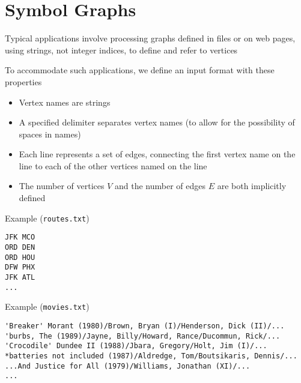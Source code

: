 \documentclass[8pt,a4paper,compress]{beamer}
\begin{document}
\section{Symbol Graphs}
\begin{frame}[fragile]
\pause

Typical applications involve processing graphs defined in files or
on web pages, using strings, not integer indices, to define and refer to vertices

\pause
\bigskip

To accommodate such applications, we define an input format with these properties
\begin{itemize}
\item Vertex names are strings
\item A specified delimiter separates vertex names (to allow for the possibility of spaces in names)
\item Each line represents a set of edges, connecting the first vertex name on the line to each of the other vertices named on the line
\item The number of vertices $V$ and the number of edges $E$ are both implicitly defined
\end{itemize}

\pause
\bigskip

Example (\lstinline{routes.txt})
\begin{lstlisting}[language={}]
JFK MCO
ORD DEN
ORD HOU
DFW PHX
JFK ATL
...
\end{lstlisting}

\pause

Example (\lstinline{movies.txt})
\begin{lstlisting}[language={}]
'Breaker' Morant (1980)/Brown, Bryan (I)/Henderson, Dick (II)/...
'burbs, The (1989)/Jayne, Billy/Howard, Rance/Ducommun, Rick/... 
'Crocodile' Dundee II (1988)/Jbara, Gregory/Holt, Jim (I)/... 
*batteries not included (1987)/Aldredge, Tom/Boutsikaris, Dennis/...
...And Justice for All (1979)/Williams, Jonathan (XI)/...
...
\end{lstlisting}
\end{frame}
\end{document}
